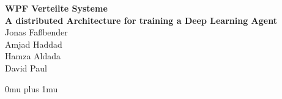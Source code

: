 \documentclass[12pt, twoside]{article}
\begin{document}
\begin{titlepage}
	\begin{center}
		{\Huge{\textbf{WPF Verteilte Systeme}}} \\
	\vspace{3cm}
		{\Huge{\textbf{A distributed Architecture for training
      a Deep Learning Agent}}} \\
	\vspace{2cm}
		\huge{Jonas Fa{\ss}bender} \\
	\vspace{.5cm}
		\huge{Amjad Haddad} \\
	\vspace{.5cm}
		\huge{Hamza Aldada} \\
	\vspace{.5cm}
		\huge{David Paul}
	\end{center}
%
%
%
%
%
%
%
%
%
%
%
%
%
%
%
%
%
\end{titlepage}

\tableofcontents
\newpage
\listoffigures





\printindex
\Urlmuskip 0mu plus 1mu\relax

\end{document}
